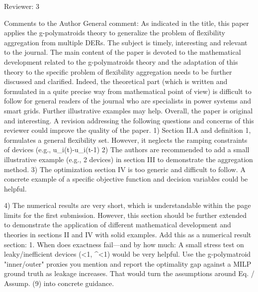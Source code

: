 Reviewer: 3

Comments to the Author
General comment:
As indicated in the title, this paper applies the g-polymatroids theory to generalize the problem of flexibility aggregation from multiple DERs.
The subject is timely, interesting and relevant to the journal. The main content of the paper is devoted to the mathematical development related to the g-polymatroids theory and the adaptation of this theory to the specific problem of flexibility aggregation needs to be further discussed and clarified. Indeed, the theoretical part (which is written and formulated in a quite precise way from mathematical point of view) is difficult to follow for general readers of the journal who are specialists in power systems and smart grids. Further illustrative examples may help.
Overall, the paper is original and interesting. A revision addressing the following questions and concerns of this reviewer could improve the quality of the paper.
1) Section II.A and definition 1, formulates a general flexibility set. However, it neglects the ramping constraints of devices (e.g., u_i(t)-u_i(t-1) 2) The authors are recommended to add a small illustrative example (e.g., 2 devices) in section III to demonstrate the aggregation method.
3) The optimization section IV is too generic and difficult to follow. A concrete example of a specific objective function and decision variables could be helpful.

4) The numerical results are very short, which is understandable within the page limits for the first submission. However, this section should be further extended to demonstrate the application of different mathematical development and theories in sections II and IV with solid examples.
Add this as a numerical result section: 1. When does exactness fail—and by how much: A small stress test on leaky/inefficient devices (\lambda<1, \eta^\pm<1) would be very helpful. Use the g-polymatroid "inner/outer" proxies you mention and report the optimality gap against a MILP ground truth as leakage increases. That would turn the assumptions around Eq. / Assump. (9) into concrete guidance.